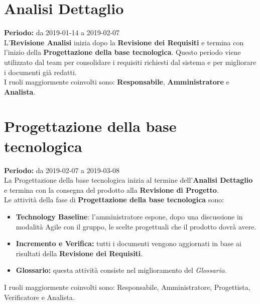 \section{Analisi Dettaglio}
\textbf{Periodo:} da 2019-01-14 a 2019-02-07\\
L'\textbf{Revisione Analisi} inizia dopo la \textbf{Revisione dei Requisiti} e termina con l’inizio della \textbf{Progettazione della base tecnologica}. Questo periodo viene utilizzato dal team per consolidare i requisiti richiesti dal sistema e per migliorare i documenti già redatti.\\I ruoli maggiormente coinvolti sono: \textbf{Responsabile}, \textbf{Amministratore} e \textbf{Analista}.

\section{Progettazione della base tecnologica}
\textbf{Periodo:} da 2019-02-07 a 2019-03-08\\
La Progettazione della base tecnologica inizia al termine dell’\textbf{Analisi Dettaglio} e termina con la consegna del prodotto alla \textbf{Revisione di Progetto}.\\
Le attività della fase di \textbf{Progettazione della base tecnologica} sono:
\begin{itemize}
    \item \textbf{Technology Baseline}: l'amministratore espone, dopo una discussione in modalità Agile con il gruppo, le scelte progettuali che il prodotto dovrà avere.
    \item \textbf{Incremento e Verifica:} tutti i documenti vengono aggiornati in base ai risultati della \textbf{Revisione dei Requisiti}.
    \item \textbf{Glossario:} questa attività consiste nel miglioramento del \textit{Glossario}.
\end{itemize}
I ruoli maggiormente coinvolti sono: Responsabile, Amministratore, Progettista, Verificatore e Analista.

